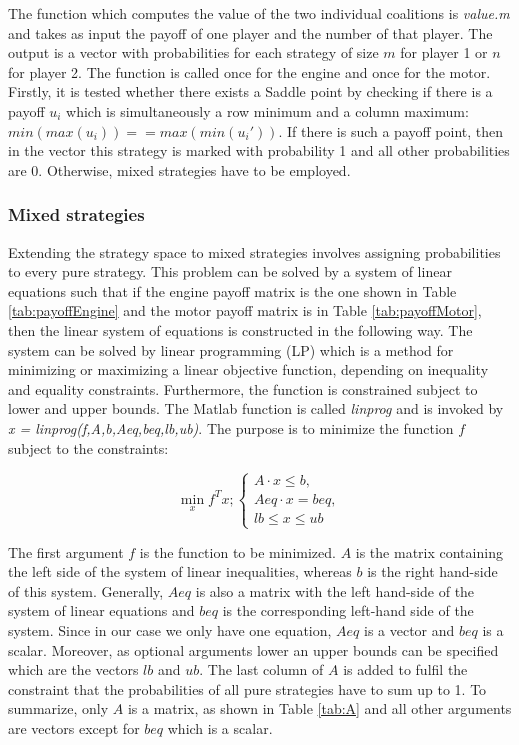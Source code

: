 The function which computes the value of the two individual coalitions is \textit{value.m} and takes as input the payoff of one player and the number of that player. The output is a vector with probabilities for each strategy of size $m$ for player 1 or $n$ for player 2. The function is called once for the engine and once for the motor. Firstly, it is tested whether there exists a Saddle point by checking if there is a payoff $u_i$ which is simultaneously a row minimum and a column maximum: $min(max(u_i)) == max(min(u_i'))$. If there is such a payoff point, then in the vector this strategy is marked with probability 1 and all other probabilities are 0. Otherwise, mixed strategies have to be employed. 

\subsubsection{Mixed strategies}

Extending the strategy space to mixed strategies involves assigning probabilities to every pure strategy. This problem can be solved by a system of linear equations such that if the engine payoff matrix is the one shown in Table \ref{tab:payoffEngine} and the motor payoff matrix is in Table \ref{tab:payoffMotor}, then the linear system of equations is constructed in the following way. The system can be solved by linear programming (LP) which is a method for minimizing or maximizing a linear objective function, depending on inequality and equality constraints. Furthermore, the function is constrained subject to lower and upper bounds. The Matlab function is called \textit{linprog} and is invoked by \textit{x = linprog(f,A,b,Aeq,beq,lb,ub)}. The purpose is to minimize the function $f$ subject to the constraints:

\begin{equation}
\min_x f^Tx ; \left\{
                \begin{array}{ll}
                  A \cdot x \leq b,\\
                  Aeq \cdot x = beq,\\
                  lb \leq x \leq ub
                \end{array}
              \right.
\end{equation}

The first argument $f$ is the function to be minimized. $A$ is the matrix containing the left side of the system of linear inequalities, whereas $b$ is the right hand-side of this system. Generally, $Aeq$ is also a matrix with the left hand-side of the system of linear equations and $beq$ is the corresponding left-hand side of the system. Since in our case we only have one equation, $Aeq$ is a vector and $beq$ is a scalar. Moreover, as optional arguments lower an upper bounds can be specified which are the vectors $lb$ and $ub$. The last column of $A$ is added to fulfil the constraint that the probabilities of all pure strategies have to sum up to 1. To summarize, only $A$ is a matrix, as shown in Table \ref{tab:A} and all other arguments are vectors except for $beq$ which is a scalar.

